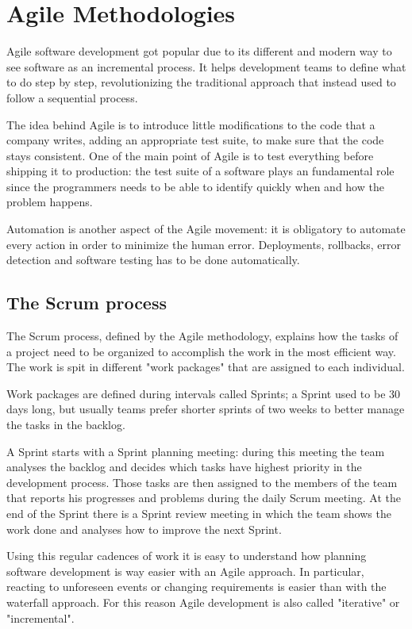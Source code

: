 \section{Agile Methodologies}

Agile software development \cite{AgileSoftwareManifesto} got popular due
to its different and modern way to see software as an incremental process.
It helps development teams to define what to do step by step,
revolutionizing the traditional approach that instead used to follow
a sequential process.

The idea behind Agile is to introduce little modifications to the code
that a company writes, adding an appropriate test suite, to make sure that
the code stays consistent. One of the main point of Agile is to test
everything before shipping it to production: the test suite of a software
plays an fundamental role since the programmers needs to be able to
identify quickly when and how the problem happens.

Automation is another aspect of the Agile movement: it is obligatory to
automate every action in order to minimize the human error. Deployments,
rollbacks, error detection and software testing has to be done
automatically.

\subsection{The Scrum process}

The Scrum process, defined by the Agile methodology, explains how the
tasks of a project need to be organized to accomplish the work in the most
efficient way. The work is spit in different "work packages" that are
assigned to each individual.

Work packages are defined during intervals called Sprints; a Sprint used
to be 30 days long, but usually teams prefer shorter sprints of two weeks
to better manage the tasks in the backlog.

A Sprint starts with a Sprint planning meeting: during this meeting the team
analyses the backlog and decides which tasks have highest priority in the
development process. Those tasks are then assigned to the members of the
team that reports his progresses and problems during the daily Scrum
meeting. At the end of the Sprint there is a Sprint review meeting in
which the team shows the work done and analyses how to improve the next
Sprint.

Using this regular cadences of work it is easy to understand how planning
software development is way easier with an Agile approach. In particular,
reacting to unforeseen events or changing requirements is easier than with
the waterfall approach. For this reason Agile development is also called
"iterative" or "incremental".

